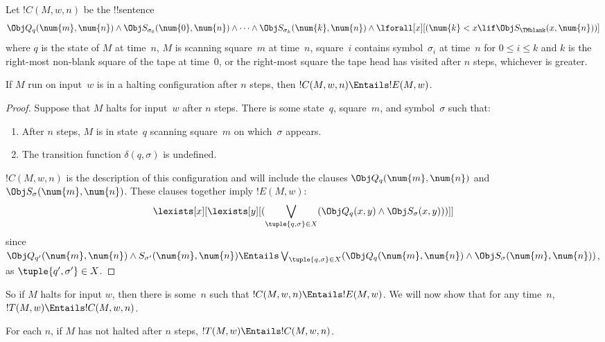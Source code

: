 \documentclass[../../../include/open-logic-section]{subfiles}
\begin{document}
\begin{defn} 
Let $!C(M, w, n)$ be the !!{sentence}
\[ 
\Obj Q_q(\num{m}, \num{n}) \land \Obj S_{\sigma_0}(\num{0}, \num{n})
\land \dots \land \Obj S_{\sigma_k}(\num{k}, \num{n}) \land
\lforall[x][(\num{k} < x \lif \Obj S_\TMblank(x, \num{n}))]
\] 
where $q$ is the state of $M$ at time~$n$, $M$ is scanning square~$m$
at time~$n$, square~$i$ contains symbol~$\sigma_i$ at time~$n$ for $0
\le i \le k$ and $k$ is the right-most non-blank square of the tape at
time~$0$, or the right-most square the tape head has visited after $n$
steps, whichever is greater.
\end{defn}

\begin{lem}
If $M$ run on input~$w$ is in a halting configuration after $n$ steps,
then $!C(M, w, n) \Entails !E(M, w)$.
\end{lem}

\begin{proof}
Suppose that $M$ halts for input~$w$ after $n$ steps.
There is some state~$q$, square~$m$, and symbol~$\sigma$ such that:
\begin{enumerate} 
\item After $n$ steps, $M$ is in state~$q$ scanning square~$m$ on
  which~$\sigma$ appears.
\item The transition function $\delta(q, \sigma)$ is undefined.
\end{enumerate}
$!C(M, w, n)$ is the description of this configuration and will
include the clauses $\Obj Q_{q}(\num{m}, \num{n})$ and $\Obj
S_{\sigma}(\num{m}, \num{n})$. These clauses together imply $!E(M,
w)$:
\[
\lexists[x][\lexists[y][(\bigvee_{\tuple{q, \sigma} \in
      X}(\Obj Q_q(x, y) \land \Obj S_\sigma(x, y)))]]
\]
since $\Obj Q_{q'}(\num{m}, \num{n}) \land S_{\sigma'}(\num{m},
\num{n}) \Entails \bigvee_{\tuple{q, \sigma} \in X} (\Obj Q_q(\num{m},
\num{n}) \land \Obj S_{\sigma}(\num{m}, \num{n}))$, as
$\tuple{q',\sigma'} \in X$. 
\end{proof}

\begin{explain}
So if $M$ halts for input $w$, then there is some~$n$ such that $!C(M,
w, n) \Entails !E(M,w)$.  We will now show that for any time~$n$,
$!T(M, w) \Entails !C(M, w, n)$.
\end{explain}

\begin{lem}
For each $n$, if $M$ has not halted after $n$ steps, $!T(M, w)
\Entails !C(M, w, n)$.
\end{lem}
\end{document}
